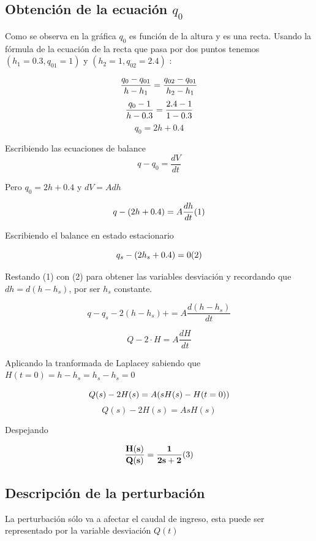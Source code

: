 \documentclass[
  letterpaper,
  DIV=11,
  numbers=noendperiod]{scrreprt}
\begin{document}
\hypertarget{obtenciuxf3n-de-la-ecuaciuxf3n-q_0}{%
\subsection{\texorpdfstring{Obtención de la ecuación
\(q_0\)}{Obtención de la ecuación q\_0}}\label{obtenciuxf3n-de-la-ecuaciuxf3n-q_0}}

Como se observa en la gráfica \(q_0\) es función de la altura y es una
recta. Usando la fórmula de la ecuación de la recta que pasa por dos
puntos tenemos \((h_{1}=0.3,q_{01}=1)\) y \((h_{2}=1,q_{02}=2.4)\) :

\[
\frac{q_0-q_{01}}{h-h_1}=\frac{q_{02}-q_{01}}{h_2 - h_1}\\
\] \[
\frac{q_0-1}{h-0.3}=\frac{2.4-1}{1 - 0.3}\\
\] \[
q_0 = 2h+0.4
\]

Escribiendo las ecuaciones de balance \[
q - q_0 = \frac{dV}{dt}
\]

Pero \(q_0 = 2h+0.4\) y \(dV = Adh\)

\[
q- (2h+0.4) = A\frac{dh}{dt} \space\space\space\space (1)
\]

Escribiendo el balance en estado estacionario

\[
q_s- (2h_s+0.4) = 0 \space\space\space\space (2)
\]

Restando (1) con (2) para obtener las variables desviación y recordando
que \(dh=d(h-h_s)\), por ser \(h_s\) constante.

\[
q-q_s-2(h-h_s)+=A\frac{d(h-h_s)}{dt}
\]

\[
Q - 2\cdot H = A\frac{dH}{dt}
\]

Aplicando la tranformada de Laplacey sabiendo que
\(H(t=0)= h-h_s=h_s-h_s=0\)

\[
Q(s) - 2H(s) = A(sH(s)-H(t=0))\\
\] \[
Q(s) - 2H(s) = AsH(s)
\]

Despejando

\[
\mathbf{\frac{H(s)}{Q(s)}=\frac{1}{2 s+2}} \space\space\space\space (3) \\
\]

\hypertarget{descripciuxf3n-de-la-perturbaciuxf3n}{%
\subsection{Descripción de la
perturbación}\label{descripciuxf3n-de-la-perturbaciuxf3n}}

La perturbación sólo va a afectar el caudal de ingreso, esta puede ser
representado por la variable desviación \(Q(t)\)
\end{document}
